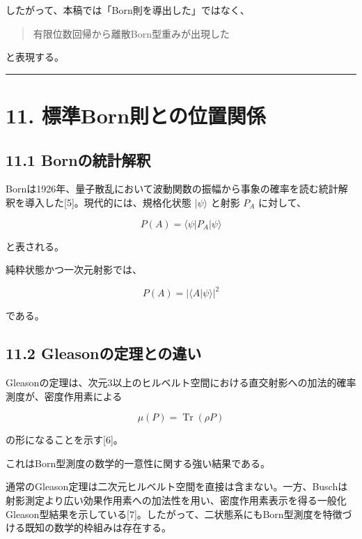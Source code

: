 \documentclass[
  a4paper,
  10pt]{article}
\begin{document}
したがって、本稿では「Born則を導出した」ではなく、

\begin{quote}
有限位数回帰から離散Born型重みが出現した
\end{quote}

と表現する。

\begin{center}\rule{0.5\linewidth}{0.5pt}\end{center}

\section{11.
標準Born則との位置関係}\label{11-ux6a19ux6e96bornux5247ux3068ux306eux4f4dux7f6eux95a2ux4fc2}

\subsection{11.1
Bornの統計解釈}\label{111-bornux306eux7d71ux8a08ux89e3ux91c8}

Bornは1926年、量子散乱において波動関数の振幅から事象の確率を読む統計解釈を導入した{[}5{]}。現代的には、規格化状態
\(|\psi\rangle\) と射影 \(P_A\) に対して、

\[
P(A)=\langle\psi|P_A|\psi\rangle
\]

と表される。

純粋状態かつ一次元射影では、

\[
P(A)=|\langle A|\psi\rangle|^2
\]

である。

\subsection{11.2
Gleasonの定理との違い}\label{112-gleasonux306eux5b9aux7406ux3068ux306eux9055ux3044}

Gleasonの定理は、次元3以上のヒルベルト空間における直交射影への加法的確率測度が、密度作用素による

\[
\mu(P)=\operatorname{Tr}(\rho P)
\]

の形になることを示す{[}6{]}。

これはBorn型測度の数学的一意性に関する強い結果である。

通常のGleason定理は二次元ヒルベルト空間を直接は含まない。一方、Buschは射影測定より広い効果作用素への加法性を用い、密度作用素表示を得る一般化Gleason型結果を示している{[}7{]}。したがって、二状態系にもBorn型測度を特徴づける既知の数学的枠組みは存在する。
\end{document}
